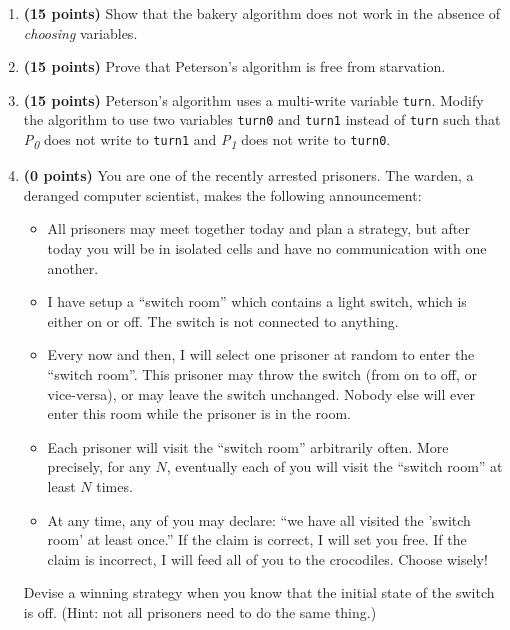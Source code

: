 \documentclass[11pt]{article}
\begin{document}
\begin{enumerate}
\item \textbf{(15 points)} Show that the bakery algorithm does not work in the
  absence of \emph{choosing} variables.
\item \textbf{(15 points)} Prove that Peterson's algorithm is free from starvation.
\item \textbf{(15 points)} Peterson's algorithm uses a multi-write variable
  \texttt{turn}. Modify the algorithm to use two variables \texttt{turn0} and
  \texttt{turn1} instead of \texttt{turn} such that \emph{P\textsubscript{0}}
  does not write to \texttt{turn1} and \emph{P\textsubscript{1}} does not write
  to \texttt{turn0}.
\item \textbf{(0 points)} You are one of the recently arrested prisoners. The
  warden, a deranged computer scientist, makes the following announcement:
  \begin{itemize}
  \item All prisoners may meet together today and plan a strategy, but after
    today you will be in isolated cells and have no communication with one
    another.
  \item I have setup a ``switch room'' which contains a light switch, which is
    either on or off. The switch is not connected to anything.
  \item Every now and then, I will select one prisoner at random to enter the
    ``switch room''. This prisoner may throw the switch (from on to off, or
    vice-versa), or may leave the switch unchanged. Nobody else will ever enter
    this room while the prisoner is in the room.
  \item Each prisoner will visit the ``switch room'' arbitrarily often. More
    precisely, for any $N$, eventually each of you will visit the ``switch
    room'' at least $N$ times.
  \item At any time, any of you may declare: ``we have all visited the 'switch
    room' at least once.''  If the claim is correct, I will set you free. If the
    claim is incorrect, I will feed all of you to the crocodiles. Choose wisely!
  \end{itemize}

  Devise a winning strategy when you know that the initial state of the switch
  is off. (Hint: not all prisoners need to do the same thing.)

\end{enumerate}
\end{document}
